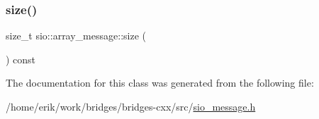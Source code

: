 \mbox{\label{classsio_1_1array__message_ae854fb58883883ccc930de77285d7dae}} 
\subsubsection{\texorpdfstring{size()}{size()}}
{\footnotesize\ttfamily size\+\_\+t sio\+::array\+\_\+message\+::size (\begin{DoxyParamCaption}{ }\end{DoxyParamCaption}) const\hspace{0.3cm}{\ttfamily [inline]}}



The documentation for this class was generated from the following file\+:\begin{DoxyCompactItemize}
\item 
/home/erik/work/bridges/bridges-\/cxx/src/\hyperlink{sio__message_8h}{sio\+\_\+message.\+h}\end{DoxyCompactItemize}
